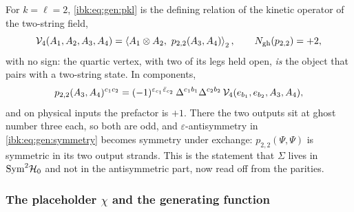 \begin{example}
  \label{ibk:ex:p22}
  For $k=\ell=2$, \eqref{ibk:eq:gen:pkl} is the defining relation of the kinetic operator of the two-string field,
  \begin{equation}
    \label{ibk:eq:gen:p22}
    {\mathcal{V}}_4(A_1,A_2,A_3,A_4)
      = \braket{A_1\otimes A_2,\ p_{2,2}(A_3,A_4)}_2,
    \qquad
    N_{\rm gh}(p_{2,2})
      = +2,
  \end{equation}
  with no sign: the quartic vertex, with two of its legs held open, \emph{is} the object that pairs with a two-string state. In components,
  \begin{equation}
    \label{ibk:eq:gen:p22-comp}
    p_{2,2}(A_3,A_4)^{c_1c_2}
      = (-1)^{\varepsilon_{c_1}\bar\varepsilon_{c_2}}\,
        \Delta^{c_1b_1}\Delta^{c_2b_2}\,
        {\mathcal{V}}_4(e_{b_1},e_{b_2},A_3,A_4),
  \end{equation}
  and on physical inputs the prefactor is $+1$. There the two outputs sit at ghost number three each, so both are odd, and $\varepsilon$-antisymmetry in \eqref{ibk:eq:gen:symmetry} becomes symmetry under exchange: $p_{2,2}(\Psi,\Psi)$ is symmetric in its two output strands. This is the statement that $\Sigma$ lives in $\mathrm{Sym}^2{\mathcal{H}}_0$ and not in the antisymmetric part, now read off from the parities.
\end{example}

\subsubsection{The placeholder \texorpdfstring{$\chi$}{chi} and the generating function}
\label{ibk:sec:gen:genfun}

